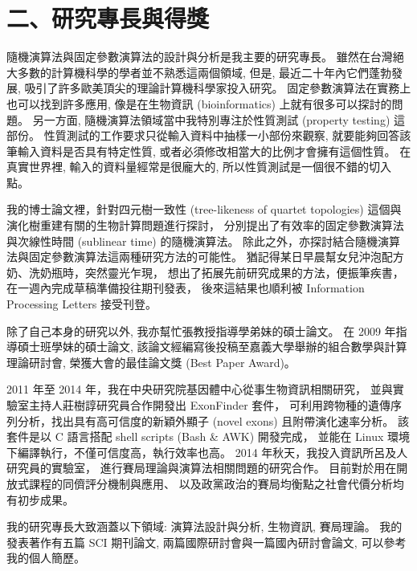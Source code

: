\documentclass[10pt,a4paper]{article}
\begin{document}
\section*{\bf\large 二、研究專長與得獎}
\label{sec:personal-background}


隨機演算法與固定參數演算法的設計與分析是我主要的研究專長。  
雖然在台灣絕大多數的計算機科學的學者並不熟悉這兩個領域, 
但是, 最近二十年內它們蓬勃發展, 吸引了許多歐美頂尖的理論計算機科學家投入研究。
固定參數演算法在實務上也可以找到許多應用, 
像是在生物資訊 (bioinformatics) 上就有很多可以探討的問題。
另一方面, 隨機演算法領域當中我特別專注於性質測試 (property testing) 這部份。 
性質測試的工作要求只從輸入資料中抽樣一小部份來觀察, 
就要能夠回答該筆輸入資料是否具有特定性質, 或者必須修改相當大的比例才會擁有這個性質。 
在真實世界裡, 輸入的資料量經常是很龐大的, 所以性質測試是一個很不錯的切入點。


我的博士論文裡，針對四元樹一致性 (tree-likeness of quartet topologies) 
這個與演化樹重建有關的生物計算問題進行探討，
分別提出了有效率的固定參數演算法與次線性時間 (sublinear time) 的隨機演算法。
除此之外，亦探討結合隨機演算法與固定參數演算法這兩種研究方法的可能性。
猶記得某日早晨幫女兒沖泡配方奶、洗奶瓶時，突然靈光乍現，
想出了拓展先前研究成果的方法，便振筆疾書，在一週內完成草稿準備投往期刊發表，
後來這結果也順利被 Information Processing Letters 接受刊登。

除了自己本身的研究以外, 我亦幫忙張教授指導學弟妹的碩士論文。 
在 2009 年指導碩士班學妹的碩士論文, 
該論文經編寫後投稿至嘉義大學舉辦的組合數學與計算理論研討會, 
榮獲大會的最佳論文獎 (Best Paper Award)。

2011 年至 2014 年，我在中央研究院基因體中心從事生物資訊相關研究， 
並與實驗室主持人莊樹諄研究員合作開發出 ExonFinder 套件， 
可利用跨物種的遺傳序列分析，找出具有高可信度的新穎外顯子 (novel exons) 
且附帶演化速率分析。 
該套件是以 C 語言搭配 shell scripts (Bash \& AWK) 開發完成， 
並能在 Linux 環境下編譯執行，不僅可信度高，執行效率也高。
2014 年秋天，我投入資訊所呂及人研究員的實驗室， 
進行賽局理論與演算法相關問題的研究合作。
目前對於用在開放式課程的同儕評分機制與應用、 
以及政黨政治的賽局均衡點之社會代價分析均有初步成果。


我的研究專長大致涵蓋以下領域:  演算法設計與分析, 生物資訊, 賽局理論。 
我的發表著作有五篇 SCI 期刊論文, 兩篇國際研討會與一篇國內研討會論文,
 可以參考我的個人簡歷。


\end{document}

